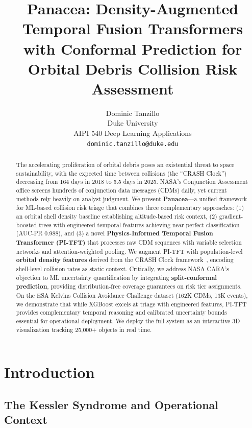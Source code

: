 \documentclass{article}
\title{Panacea: Density-Augmented Temporal Fusion Transformers with Conformal Prediction for Orbital Debris Collision Risk Assessment}
\author{
  Dominic Tanzillo \\
  Duke University \\
  AIPI 540 Deep Learning Applications \\
  \texttt{dominic.tanzillo@duke.edu}
}
\begin{document}
\maketitle

\begin{abstract}
The accelerating proliferation of orbital debris poses an existential threat to space sustainability, with the expected time between collisions (the ``CRASH Clock'') decreasing from 164 days in 2018 to 5.5 days in 2025. NASA's Conjunction Assessment office screens hundreds of conjunction data messages (CDMs) daily, yet current methods rely heavily on analyst judgment. We present \textbf{Panacea}---a unified framework for ML-based collision risk triage that combines three complementary approaches: (1) an orbital shell density baseline establishing altitude-based risk context, (2) gradient-boosted trees with engineered temporal features achieving near-perfect classification (AUC-PR 0.988), and (3) a novel \textbf{Physics-Informed Temporal Fusion Transformer (PI-TFT)} that processes raw CDM sequences with variable selection networks and attention-weighted pooling. We augment PI-TFT with population-level \textbf{orbital density features} derived from the CRASH Clock framework~\citep{thiele2025}, encoding shell-level collision rates as static context. Critically, we address NASA CARA's objection to ML uncertainty quantification by integrating \textbf{split-conformal prediction}, providing distribution-free coverage guarantees on risk tier assignments. On the ESA Kelvins Collision Avoidance Challenge dataset (162K CDMs, 13K events), we demonstrate that while XGBoost excels at triage with engineered features, PI-TFT provides complementary temporal reasoning and calibrated uncertainty bounds essential for operational deployment. We deploy the full system as an interactive 3D visualization tracking 25,000+ objects in real time.
\end{abstract}

\section{Introduction}
\label{sec:introduction}

\subsection{The Kessler Syndrome and Operational Context}
\label{sec:kessler}
\end{document}
